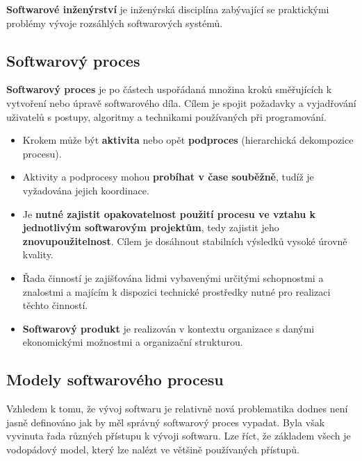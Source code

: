 \textbf{Softwarové inženýrství} je inženýrská disciplína zabývající se praktickými problémy vývoje rozsáhlých softwarových systémů.

\subsection{Softwarový proces}
\textbf{Softwarový proces} je po částech uspořádaná množina kroků směřujících k vytvoření nebo úpravě softwarového díla. Cílem je spojit požadavky a vyjadřování uživatelů s postupy, algoritmy a technikami používaných při programování.

\begin{itemize}
\item Krokem může být \textbf{aktivita} nebo opět \textbf{podproces} (hierarchická dekompozice procesu). 
\item Aktivity a podprocesy mohou \textbf{probíhat v čase souběžně}, tudíž je vyžadována jejich koordinace. 
\item Je \textbf{nutné zajistit opakovatelnost použití procesu ve vztahu k jednotlivým softwarovým projektům}, tedy zajistit jeho \textbf{znovupoužitelnost}.  Cílem je dosáhnout stabilních výsledků vysoké úrovně kvality.
\item Řada činností je zajišťována lidmi vybavenými určitými schopnostmi a znalostmi a majícím k dispozici technické prostředky nutné pro realizaci těchto činností.
\item \textbf{Softwarový produkt} je realizován v kontextu organizace s danými ekonomickými možnostmi a organizační strukturou.
\end{itemize}

\subsection{Modely softwarového procesu}
Vzhledem k tomu, že vývoj softwaru je relativně nová problematika dodnes není jasně definováno jak by měl správný softwarový proces vypadat. Byla však vyvinuta řada různých přístupu k vývoji softwaru. Lze říct, že základem všech je vodopádový model, který lze nalézt ve většině používaných přístupů.

